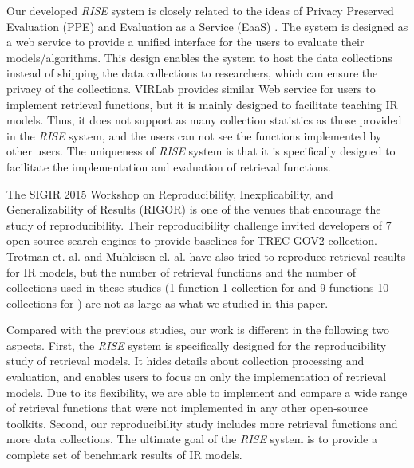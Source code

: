 Our developed {\em RISE} system is closely related to the ideas of 
Privacy Preserved Evaluation (PPE) \cite{Fang:2014:VWV:2600428.2611178}
and Evaluation as a Service (EaaS) \cite{rao:ecir:2015,
Lin:2013:ESI:2568388.2568390,
Lin:2014:ISE:2567948.2577014}. The system is designed as a 
web service to provide a unified interface for the users to evaluate their 
models/algorithms. This design enables the system to host the data 
collections instead of shipping the data collections to researchers, 
which can ensure the privacy of the collections. 
VIRLab \cite{Fang:2014:VWV:2600428.2611178} provides similar Web service
for users to implement retrieval functions, but it is mainly designed
to facilitate teaching IR models.  Thus, it does not support as 
many collection statistics as those provided in the {\em RISE} system, 
and the users can not see the functions implemented by other users. 
The uniqueness of 
{\em RISE} system is that it is specifically designed to facilitate the 
implementation and evaluation of retrieval functions.  

The SIGIR 2015 Workshop on Reproducibility, Inexplicability, and 
Generalizability of Results (RIGOR) \cite{Hopfgartner:2015:REE:2795403.2795416} 
is one of the venues that encourage the study of reproducibility. 
Their reproducibility challenge invited developers 
of 7 open-source search engines to provide baselines for TREC GOV2 
collection.
Trotman et. al. \cite{adcs14} and Muhleisen el. al. \cite{Muhleisen:2014:ODG:2600428.2609460} 
have also tried to reproduce retrieval results for IR models, but the
number of retrieval functions and the number of collections used in these studies 
(1 function 1 collection for \cite{adcs14} and 9 functions  
10 collections for \cite{Muhleisen:2014:ODG:2600428.2609460})
are not as large as what we studied in this paper. 

Compared with the previous studies, our work is different in the following
two aspects. First, the {\em RISE} system is specifically designed for 
the reproducibility study of retrieval models. It hides details about 
collection processing and evaluation, and enables users to focus on 
only the implementation of retrieval models. Due to its flexibility, 
we are able to implement and compare a wide range of retrieval functions 
that were not implemented in any other open-source toolkits. Second, 
our reproducibility study includes more retrieval functions and more data 
collections. The ultimate goal of the {\em RISE} system is to provide 
a complete set of benchmark results of IR models. 


